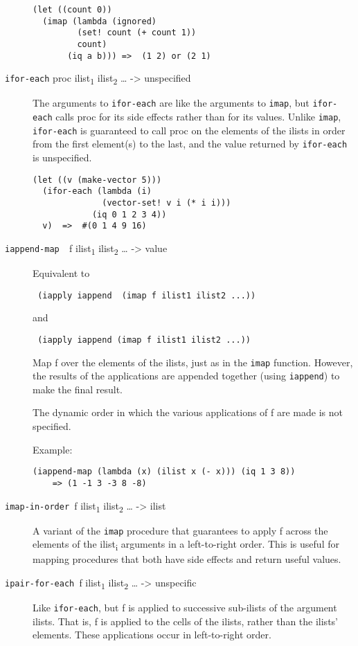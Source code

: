 \begin{description}
\begin{verbatim}
(let ((count 0))
  (imap (lambda (ignored)
         (set! count (+ count 1))
         count)
       (iq a b))) =>  (1 2) or (2 1)
\end{verbatim}
\item[ \href{}{} \texttt{ifor-each} proc ilist\textsubscript{1}
ilist\textsubscript{2} \ldots{} -\textgreater{} unspecified ]
The arguments to \texttt{ifor-each} are like the arguments to
\texttt{imap}, but \texttt{ifor-each} calls proc for its side effects
rather than for its values. Unlike \texttt{imap}, \texttt{ifor-each} is
guaranteed to call proc on the elements of the ilists in order from the
first element(s) to the last, and the value returned by
\texttt{ifor-each} is unspecified.

\begin{verbatim}
(let ((v (make-vector 5)))
  (ifor-each (lambda (i)
              (vector-set! v i (* i i)))
            (iq 0 1 2 3 4))
  v)  =>  #(0 1 4 9 16)
\end{verbatim}
\item[ \href{}{} \texttt{iappend-map~~}f ilist\textsubscript{1}
ilist\textsubscript{2} \ldots{} -\textgreater{} value ]
Equivalent to

\texttt{\ (iapply\ iappend\ \ (imap\ f\ ilist1\ ilist2\ ...))}

and

\texttt{\ (iapply\ iappend\ (imap\ f\ ilist1\ ilist2\ ...))}

Map f over the elements of the ilists, just as in the \texttt{imap}
function. However, the results of the applications are appended together
(using \texttt{iappend}) to make the final result.

The dynamic order in which the various applications of f are made is not
specified.

Example:

\begin{verbatim}
(iappend-map (lambda (x) (ilist x (- x))) (iq 1 3 8))
    => (1 -1 3 -3 8 -8)
\end{verbatim}
\item[ \href{}{} \texttt{imap-in-order\ }f ilist\textsubscript{1}
ilist\textsubscript{2} \ldots{} -\textgreater{} ilist ]
A variant of the \texttt{imap} procedure that guarantees to apply f
across the elements of the ilist\textsubscript{i} arguments in a
left-to-right order. This is useful for mapping procedures that both
have side effects and return useful values.
\item[ \href{}{} \texttt{ipair-for-each\ }f ilist\textsubscript{1}
ilist\textsubscript{2} \ldots{} -\textgreater{} unspecific ]
Like \texttt{ifor-each}, but f is applied to successive sub-ilists of
the argument ilists. That is, f is applied to the cells of the ilists,
rather than the ilists' elements. These applications occur in
left-to-right order.


\end{description}
